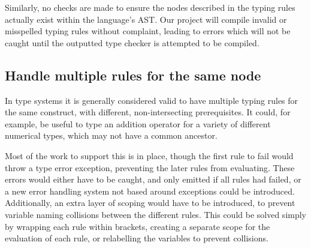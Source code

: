 \documentclass[nofilelist]{cslthse-msc}
\newcommand{\CR}[1]{\textcolor{green!60!black}{[\textbf{CR}:#1]}}
\begin{document}
Similarly, no checks are made to ensure the nodes described in the typing rules actually exist within the language's AST.
Our project will compile invalid or misspelled typing rules without complaint, leading to errors which will not be caught until the outputted type checker is attempted to be compiled.

\subsection{Handle multiple rules for the same node}
In type systems it is generally considered valid to have multiple typing rules for the same construct, with different, non-intersecting prerequisites.
It could, for example, be useful to type an addition operator for a variety of different numerical types, which may not have a common ancestor.

Most of the work to support this is in place, though the first rule to fail would throw a type error exception, preventing the later rules from evaluating.
These errors would either have to be caught, and only emitted if all rules had failed, or a new error handling system not based around exceptions could be introduced.
Additionally, an extra layer of scoping would have to be introduced, to prevent variable naming collisions between the different rules.
This could be solved simply by wrapping each rule within brackets, creating a separate scope for the evaluation of each rule, or relabelling the variables to prevent collisions.





{} %
\end{document}
